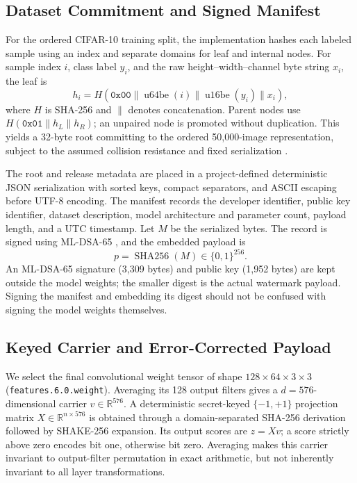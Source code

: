 \documentclass[conference]{IEEEtran}
\begin{document}
\subsection{Dataset Commitment and Signed Manifest}
For the ordered CIFAR-10 training split, the implementation hashes each labeled
sample using an index and separate domains for leaf and internal nodes. For
sample index $i$, class label $y_i$, and the raw height--width--channel byte
string $x_i$, the leaf is
\begin{equation}
 h_i=H\!\left(\texttt{0x00}\parallel\operatorname{u64be}(i)
 \parallel\operatorname{u16be}(y_i)\parallel x_i\right),
 \label{eq:leaf}
\end{equation}
where $H$ is SHA-256 and $\parallel$ denotes concatenation. Parent nodes use
$H(\texttt{0x01}\parallel h_L\parallel h_R)$; an unpaired node is promoted
without duplication. This yields a 32-byte root committing to the ordered
50,000-image representation, subject to the assumed collision resistance and
fixed serialization \cite{merkle1987digital,cifar10}.

The root and release metadata are placed in a project-defined deterministic
JSON serialization with sorted keys, compact separators, and ASCII escaping
before UTF-8 encoding. The manifest records the developer identifier, public
key identifier, dataset description, model architecture and parameter count,
payload length, and a UTC timestamp. Let $M$ be the serialized bytes. The
record is signed using ML-DSA-65 \cite{nist204}, and the embedded payload is
\begin{equation}
 p=\operatorname{SHA256}(M)\in\{0,1\}^{256}.
 \label{eq:payload}
\end{equation}
An ML-DSA-65 signature (3,309 bytes) and public key (1,952 bytes) are kept
outside the model weights; the smaller digest is the actual watermark payload.
Signing the manifest and embedding its digest should not be confused with
signing the model weights themselves.

\subsection{Keyed Carrier and Error-Corrected Payload}
We select the final convolutional weight tensor of shape
$128\times64\times3\times3$ (\texttt{features.6.0.weight}).
Averaging its 128 output filters gives a $d=576$-dimensional carrier
$v\in\mathbb{R}^{576}$. A deterministic secret-keyed $\{-1,+1\}$ projection
matrix $X\in\mathbb{R}^{n\times576}$ is obtained through a domain-separated
SHA-256 derivation followed by SHAKE-256 expansion. Its output scores are
$z=Xv$; a score strictly above zero encodes bit one, otherwise bit zero.
Averaging makes this carrier invariant to output-filter permutation in exact
arithmetic, but not inherently invariant to all layer transformations.
\end{document}

